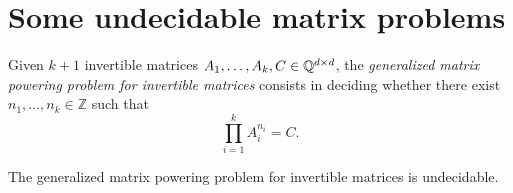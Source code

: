\section{Some undecidable matrix problems}

\label{matrix-undecidability}

Given $k+1$ invertible matrices $A_{1}, \ldots, A_{k},C \in \mathbb{Q}^{d \times d}$, the \emph{generalized matrix powering problem for invertible matrices} consists in deciding whether there exist $n_{1}, \ldots, n_{k} \in \mathbb{Z}$ such that
\begin{equation*}
\prod\limits_{i=1}^{k} A_{i}^{n_{i}} = C.
\end{equation*}

\begin{theorem}
The generalized matrix powering problem for invertible matrices is undecidable.
\end{theorem}

